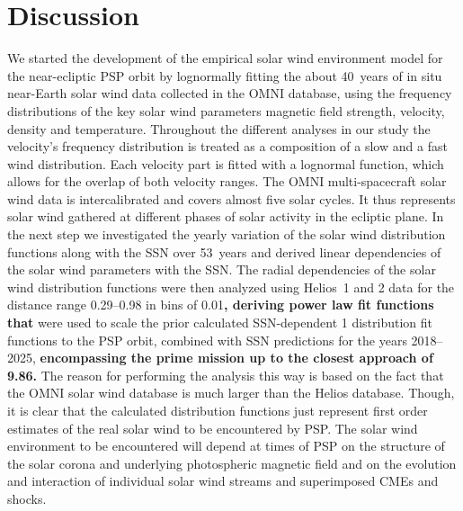 \section{Discussion}
\label{sec:discussion}
We started the development of the empirical solar wind environment model for the near-ecliptic PSP orbit by lognormally fitting the about 40~years of in situ near-Earth solar wind data collected in the OMNI database, using the frequency distributions of the key solar wind parameters magnetic field strength, velocity, density and temperature. Throughout the different analyses in our study the velocity's frequency distribution is treated as a composition of a slow and a fast wind distribution. Each velocity part is fitted with a lognormal function, which allows for the overlap of both velocity ranges. The OMNI multi-spacecraft solar wind data is intercalibrated and covers almost five solar cycles. It thus represents solar wind gathered at different phases of solar activity in the ecliptic plane. In the next step we investigated the yearly variation of the solar wind distribution functions along with the SSN over 53~years and derived linear dependencies of the solar wind parameters with the SSN. The radial dependencies of the solar wind distribution functions were then analyzed using Helios~1 and 2 data for the distance range \SIrange{0.29}{0.98}{\au} in bins of \SI{0.01}{\au}\textbf{, deriving power law fit functions that} were used to scale the prior calculated SSN-dependent \SI{1}{\au} distribution fit functions to the PSP orbit, combined with SSN predictions for the years 2018--2025, \textbf{encompassing the prime mission up to the closest approach of \SI{9.86}{\Rs}.} The reason for performing the analysis this way is based on the fact that the OMNI solar wind database is much larger than the Helios database. Though, it is clear that the calculated distribution functions just represent first order estimates of the real solar wind to be encountered by PSP. The solar wind environment to be encountered will depend at times of PSP on the structure of the solar corona and underlying photospheric magnetic field and on the evolution and interaction of individual solar wind streams and superimposed CMEs and shocks.

